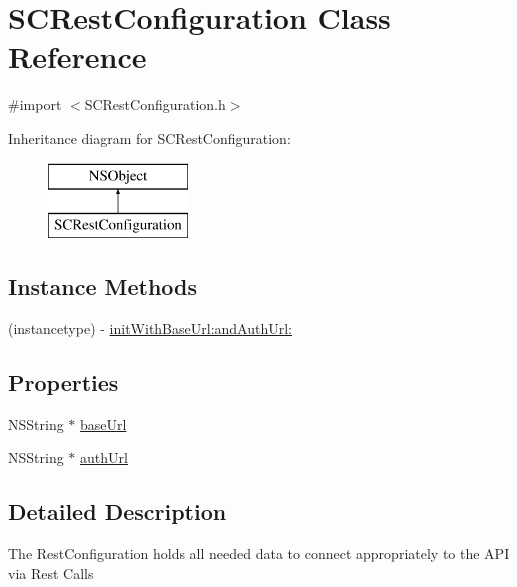 \hypertarget{interface_s_c_rest_configuration}{}\section{S\+C\+Rest\+Configuration Class Reference}
\label{interface_s_c_rest_configuration}


{\ttfamily \#import $<$S\+C\+Rest\+Configuration.\+h$>$}

Inheritance diagram for S\+C\+Rest\+Configuration\+:\begin{figure}[H]
\begin{center}
\leavevmode
\includegraphics[height=2.000000cm]{interface_s_c_rest_configuration}
\end{center}
\end{figure}
\subsection*{Instance Methods}
\begin{DoxyCompactItemize}
\item 
(instancetype) -\/ \hyperlink{interface_s_c_rest_configuration_af41bda42397b4f6b8cc89ffa0742f2e1}{init\+With\+Base\+Url\+:and\+Auth\+Url\+:}
\end{DoxyCompactItemize}
\subsection*{Properties}
\begin{DoxyCompactItemize}
\item 
N\+S\+String $\ast$ \hyperlink{interface_s_c_rest_configuration_ab62562b47f88f8e01a6f0573cab8b053}{base\+Url}
\item 
N\+S\+String $\ast$ \hyperlink{interface_s_c_rest_configuration_aa964c8baa1824ce588064babd8314059}{auth\+Url}
\end{DoxyCompactItemize}


\subsection{Detailed Description}
The Rest\+Configuration holds all needed data to connect appropriately to the A\+PI via Rest Calls 


